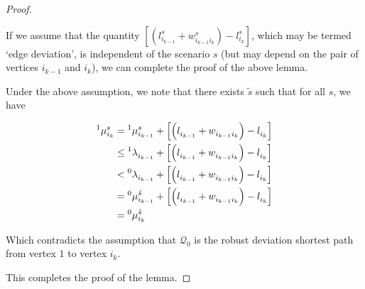 \begin{proof}
\begin{assumption}
If we assume that the quantity $\left[\left({l}^{s}_{i_{k-1}} + w^s_{i_{k-1}i_{k}}\right) - {l}^{s}_{i_{k}}\right]$, which may be termed `edge deviation', is independent of the scenario $s$ (but may depend on the pair of vertices $i_{k-1}$ and $i_k$), we can complete the proof of the above lemma.
\end{assumption}

Under the above assumption, we note that there exists $\tilde{s}$ such that for all $s$, we have

\begin{align*}
\prescript{1}{}{\mu}^{s}_{i_{k}} &= \prescript{1}{}{\mu}^{s}_{i_{k-1}} + \left[\left({l}^{}_{i_{k-1}} + w^{}_{i_{k-1}i_{k}}\right) - {l}^{}_{i_{k}}\right]\\
&\le \prescript{1}{}{\lambda}^{}_{i_{k-1}}+ \left[\left({l}^{}_{i_{k-1}} + w^{}_{i_{k-1}i_{k}}\right) - {l}^{}_{i_{k}}\right]\\
&< \prescript{0}{}{\lambda}^{}_{i_{k-1}}+ \left[\left({l}^{}_{i_{k-1}} + w^{}_{i_{k-1}i_{k}}\right) - {l}^{}_{i_{k}}\right]\\
&= \prescript{0}{}{\mu}^{\tilde{s}}_{i_{k-1}}+ \left[\left({l}^{}_{i_{k-1}} + w^{}_{i_{k-1}i_{k}}\right) - {l}^{}_{i_{k}}\right]\\
&=\prescript{0}{}{\mu}^{\tilde{s}}_{i_{k}}
\end{align*}

Which contradicts the assumption that $\mathcal{Q}_0$ is the robust deviation shortest path from vertex $1$ to vertex $i_{k}$.

This completes the proof of the lemma.

\end{proof}



\begin{comment}
Therefore 

\begin{equation*}
\prescript{1}{}{\mu}^{s}_{i_{k}} \le \left[\left({l}^{s}_{i_{k-1}} + \prescript{1}{}\lambda_{i_{k-1}}\right) + w^s_{i_{k-1}i_{k}}\right] - {l}^{s}_{i_{k}} < \left[\left({l}^{s}_{i_{k-1}} + \prescript{0}{}\lambda_{i_{k-1}}\right) + w^s_{i_{k-1}i_{k}}\right] - {l}^{s}_{i_{k}}.
\end{equation*}
\end{comment}


\begin{comment}
Similarly, the optimality of $\mathcal{Q}_0$ means that 

\begin{equation*}
\prescript{0}{}{\mu}^{s}_{i_{k}} \le \prescript{0}{}{\lambda}_{i_{k}} \le \prescript{1}{}{\lambda}_{i_{k}} = \prescript{1}{}{\mu}^{\hat{s}}_{i_{k}} = \prescript{1}{}{c}^{\hat{s}}_{i_{k}} - {l}^{\hat{s}}_{i_{k-1}}
\end{equation*}
\end{comment}

